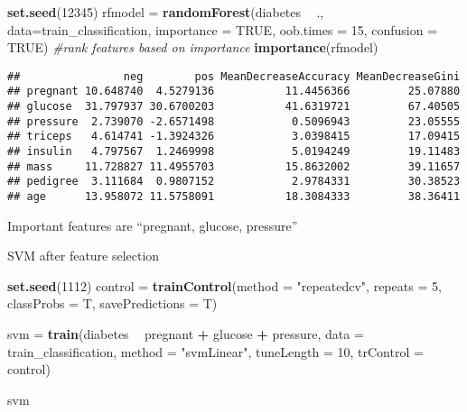 \documentclass[]{article}
\newenvironment{Shaded}{\begin{snugshade}}{\end{snugshade}}
\newcommand{\CommentTok}[1]{\textcolor[rgb]{0.56,0.35,0.01}{\textit{#1}}}
\newcommand{\DataTypeTok}[1]{\textcolor[rgb]{0.13,0.29,0.53}{#1}}
\newcommand{\DecValTok}[1]{\textcolor[rgb]{0.00,0.00,0.81}{#1}}
\newcommand{\KeywordTok}[1]{\textcolor[rgb]{0.13,0.29,0.53}{\textbf{#1}}}
\newcommand{\NormalTok}[1]{#1}
\newcommand{\OperatorTok}[1]{\textcolor[rgb]{0.81,0.36,0.00}{\textbf{#1}}}
\newcommand{\OtherTok}[1]{\textcolor[rgb]{0.56,0.35,0.01}{#1}}
\newcommand{\StringTok}[1]{\textcolor[rgb]{0.31,0.60,0.02}{#1}}
\begin{document}
\begin{Shaded}
\begin{Highlighting}[]
\KeywordTok{set.seed}\NormalTok{(}\DecValTok{12345}\NormalTok{)}
\NormalTok{rfmodel =}\StringTok{ }\KeywordTok{randomForest}\NormalTok{(diabetes }\OperatorTok{~}\StringTok{ }\NormalTok{., }\DataTypeTok{data=}\NormalTok{train_classification,  }\DataTypeTok{importance =} \OtherTok{TRUE}\NormalTok{, }\DataTypeTok{oob.times =} \DecValTok{15}\NormalTok{, }\DataTypeTok{confusion =} \OtherTok{TRUE}\NormalTok{)}
\CommentTok{#rank features based on importance }
\KeywordTok{importance}\NormalTok{(rfmodel)}
\end{Highlighting}
\end{Shaded}

\begin{verbatim}
##                neg        pos MeanDecreaseAccuracy MeanDecreaseGini
## pregnant 10.648740  4.5279136           11.4456366         25.07880
## glucose  31.797937 30.6700203           41.6319721         67.40505
## pressure  2.739070 -2.6571498            0.5096943         23.05555
## triceps   4.614741 -1.3924326            3.0398415         17.09415
## insulin   4.797567  1.2469998            5.0194249         19.11483
## mass     11.728827 11.4955703           15.8632002         39.11657
## pedigree  3.111684  0.9807152            2.9784331         30.38523
## age      13.958072 11.5758091           18.3084333         38.36411
\end{verbatim}

Important features are ``pregnant, glucose, pressure''

SVM after feature selection

\begin{Shaded}
\begin{Highlighting}[]
\KeywordTok{set.seed}\NormalTok{(}\DecValTok{1112}\NormalTok{)}
\NormalTok{control =}\StringTok{ }\KeywordTok{trainControl}\NormalTok{(}\DataTypeTok{method =} \StringTok{"repeatedcv"}\NormalTok{, }\DataTypeTok{repeats =} \DecValTok{5}\NormalTok{, }\DataTypeTok{classProbs =}\NormalTok{ T, }\DataTypeTok{savePredictions =}\NormalTok{ T)}

\NormalTok{svm =}\StringTok{ }\KeywordTok{train}\NormalTok{(diabetes }\OperatorTok{~}\StringTok{ }\NormalTok{pregnant }\OperatorTok{+}\StringTok{ }\NormalTok{glucose }\OperatorTok{+}\StringTok{ }\NormalTok{pressure,  }\DataTypeTok{data =}\NormalTok{ train_classification, }\DataTypeTok{method =} \StringTok{"svmLinear"}\NormalTok{, }\DataTypeTok{tuneLength =} \DecValTok{10}\NormalTok{, }\DataTypeTok{trControl =}\NormalTok{ control)}

\NormalTok{svm}
\end{Highlighting}
\end{Shaded}
\end{document}

